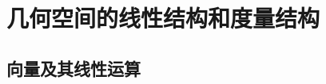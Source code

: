\documentclass[a4paper, 11pt]{ctexbook}
\begin{document}
    \chapter{几何空间的线性结构和度量结构}
        \section{向量及其线性运算}
\end{document}
